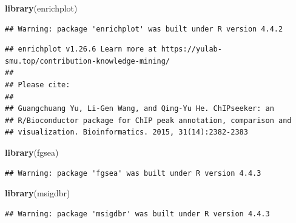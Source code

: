 \documentclass[
]{article}
\newenvironment{Shaded}{\begin{snugshade}}{\end{snugshade}}
\newcommand{\FunctionTok}[1]{\textcolor[rgb]{0.13,0.29,0.53}{\textbf{#1}}}
\newcommand{\NormalTok}[1]{#1}
\begin{document}
\begin{Shaded}
\begin{Highlighting}[]
\FunctionTok{library}\NormalTok{(enrichplot)}
\end{Highlighting}
\end{Shaded}

\begin{verbatim}
## Warning: package 'enrichplot' was built under R version 4.4.2
\end{verbatim}

\begin{verbatim}
## enrichplot v1.26.6 Learn more at https://yulab-smu.top/contribution-knowledge-mining/
## 
## Please cite:
## 
## Guangchuang Yu, Li-Gen Wang, and Qing-Yu He. ChIPseeker: an
## R/Bioconductor package for ChIP peak annotation, comparison and
## visualization. Bioinformatics. 2015, 31(14):2382-2383
\end{verbatim}

\begin{Shaded}
\begin{Highlighting}[]
\FunctionTok{library}\NormalTok{(fgsea)}
\end{Highlighting}
\end{Shaded}

\begin{verbatim}
## Warning: package 'fgsea' was built under R version 4.4.3
\end{verbatim}

\begin{Shaded}
\begin{Highlighting}[]
\FunctionTok{library}\NormalTok{(msigdbr)}
\end{Highlighting}
\end{Shaded}

\begin{verbatim}
## Warning: package 'msigdbr' was built under R version 4.4.3
\end{verbatim}
\end{document}
